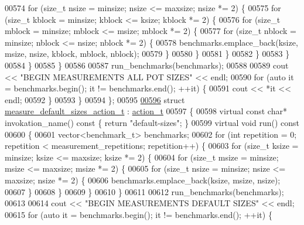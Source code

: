 \begin{DoxyCode}
{{{{{{{00574           \textcolor{keywordflow}{for} (\textcolor{keywordtype}{size\_t} nsize = minsize; nsize <= maxsize; nsize *= 2) \{
00575             \textcolor{keywordflow}{for} (\textcolor{keywordtype}{size\_t} kblock = minsize; kblock <= ksize; kblock *= 2) \{
00576               \textcolor{keywordflow}{for} (\textcolor{keywordtype}{size\_t} mblock = minsize; mblock <= msize; mblock *= 2) \{
00577                 \textcolor{keywordflow}{for} (\textcolor{keywordtype}{size\_t} nblock = minsize; nblock <= nsize; nblock *= 2) \{
00578                   benchmarks.emplace\_back(ksize, msize, nsize, kblock, mblock, nblock);
00579                 \}
00580               \}
00581             \}
00582           \}
00583         \}
00584       \}
00585     \}
00586 
00587     run\_benchmarks(benchmarks);
00588 
00589     cout << \textcolor{stringliteral}{"BEGIN MEASUREMENTS ALL POT SIZES"} << endl;
00590     \textcolor{keywordflow}{for} (\textcolor{keyword}{auto} it = benchmarks.begin(); it != benchmarks.end(); ++it) \{
00591       cout << *it << endl;
00592     \}
00593   \}
00594 \};
00595 
\hyperlink{structmeasure__default__sizes__action__t}{00596} \textcolor{keyword}{struct }\hyperlink{structmeasure__default__sizes__action__t}{measure\_default\_sizes\_action\_t} : \hyperlink{structaction__t}{action\_t}
00597 \{
00598   \textcolor{keyword}{virtual} \textcolor{keyword}{const} \textcolor{keywordtype}{char}* invokation\_name()\textcolor{keyword}{ const }\{ \textcolor{keywordflow}{return} \textcolor{stringliteral}{"default-sizes"}; \}
00599   \textcolor{keyword}{virtual} \textcolor{keywordtype}{void} run()\textcolor{keyword}{ const}
00600 \textcolor{keyword}{  }\{
00601     vector<benchmark\_t> benchmarks;
00602     \textcolor{keywordflow}{for} (\textcolor{keywordtype}{int} repetition = 0; repetition < measurement\_repetitions; repetition++) \{
00603       \textcolor{keywordflow}{for} (\textcolor{keywordtype}{size\_t} ksize = minsize; ksize <= maxsize; ksize *= 2) \{
00604         \textcolor{keywordflow}{for} (\textcolor{keywordtype}{size\_t} msize = minsize; msize <= maxsize; msize *= 2) \{
00605           \textcolor{keywordflow}{for} (\textcolor{keywordtype}{size\_t} nsize = minsize; nsize <= maxsize; nsize *= 2) \{
00606             benchmarks.emplace\_back(ksize, msize, nsize);
00607           \}
00608         \}
00609       \}
00610     \}
00611 
00612     run\_benchmarks(benchmarks);
00613 
00614     cout << \textcolor{stringliteral}{"BEGIN MEASUREMENTS DEFAULT SIZES"} << endl;
00615     \textcolor{keywordflow}{for} (\textcolor{keyword}{auto} it = benchmarks.begin(); it != benchmarks.end(); ++it) \{
}}}}}}}
\end{DoxyCode}
